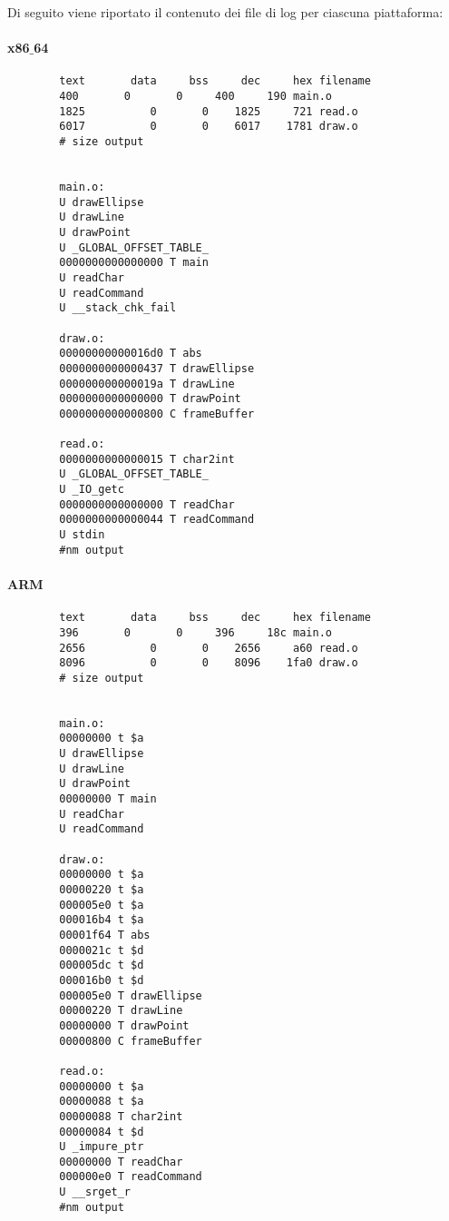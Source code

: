 \documentclass{article}
\begin{document}
Di seguito viene riportato il contenuto dei file di log per ciascuna piattaforma:
		\paragraph{x86$\_$64}
		\begin{center}
		\begin{lstlisting}
		text	   data	    bss	    dec	    hex	filename
		400	      0	      0	    400	    190	main.o
		1825	      0	      0	   1825	    721	read.o
		6017	      0	      0	   6017	   1781	draw.o
		# size output
		
		
		main.o:
		U drawEllipse
		U drawLine
		U drawPoint
		U _GLOBAL_OFFSET_TABLE_
		0000000000000000 T main
		U readChar
		U readCommand
		U __stack_chk_fail
		
		draw.o:
		00000000000016d0 T abs
		0000000000000437 T drawEllipse
		000000000000019a T drawLine
		0000000000000000 T drawPoint
		0000000000000800 C frameBuffer
		
		read.o:
		0000000000000015 T char2int
		U _GLOBAL_OFFSET_TABLE_
		U _IO_getc
		0000000000000000 T readChar
		0000000000000044 T readCommand
		U stdin
		#nm output
		\end{lstlisting}	
		\end{center}
		
		\paragraph{ARM}
		\begin{center}
		\begin{lstlisting}
		text	   data	    bss	    dec	    hex	filename
		396	      0	      0	    396	    18c	main.o
		2656	      0	      0	   2656	    a60	read.o
		8096	      0	      0	   8096	   1fa0	draw.o
		# size output
			
			
		main.o:
		00000000 t $a
		U drawEllipse
		U drawLine
		U drawPoint
		00000000 T main
		U readChar
		U readCommand
			
		draw.o:
		00000000 t $a
		00000220 t $a
		000005e0 t $a
		000016b4 t $a
		00001f64 T abs
		0000021c t $d
		000005dc t $d
		000016b0 t $d
		000005e0 T drawEllipse
		00000220 T drawLine
		00000000 T drawPoint
		00000800 C frameBuffer
		
		read.o:
		00000000 t $a
		00000088 t $a
		00000088 T char2int
		00000084 t $d
		U _impure_ptr
		00000000 T readChar
		000000e0 T readCommand
		U __srget_r
		#nm output
		\end{lstlisting}
		\end{center}
		
\end{document}
